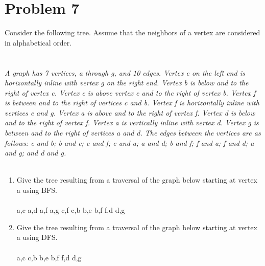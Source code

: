 \section*{Problem 7}
Consider the following tree. Assume that the neighbors of a vertex are considered in alphabetical order.
\\
\\\\
{\color{blue}{\bf Figure 15:} \emph{A graph has 7 vertices, a through g, and 10 edges. Vertex e on the left end is horizontally inline with vertex g on the right end. Vertex b is below and to the right of vertex e. Vertex c is above vertex e and to the right of vertex b. Vertex f is between and to the right of vertices c and b. Vertex f is horizontally inline with vertices e and g. Vertex a is above and to the right of vertex f. Vertex d is below and to the right of vertex f. Vertex a is vertically inline with vertex d. Vertex g is between and to the right of vertices a and d. The edges between the vertices are as follows: e and b; b and c; c and f; c and a; a and d; b and f; f and a; f and d; a and g; and d and g.
}
}
\\
\\
\begin{enumerate}[label=(\alph*)]
    \item Give the tree resulting from a traversal of the graph below starting at vertex a using BFS. \\\\
    a,c a,d a,f a,g c,f c,b b,e b,f f,d d,g
\\
    \item Give the tree resulting from a traversal of the graph below starting at vertex a using DFS.\\\\
    a,c c,b b,e b,f f,d d,g \\
    
\end{enumerate}

\newpage

